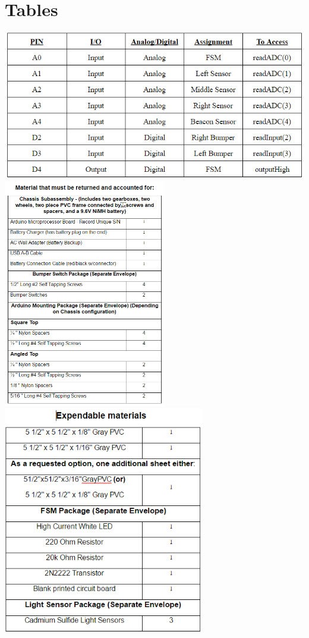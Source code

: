 \documentclass{article}
\begin{document}
\section{Tables}
\begin{center}
\includegraphics[width=\textwidth]{IOTable.png}
\includegraphics[height=10cm]{ReturnMaterial.png}
\includegraphics[height=10cm]{ExpendableMaterials.png}
\end{center}
\end{document}
